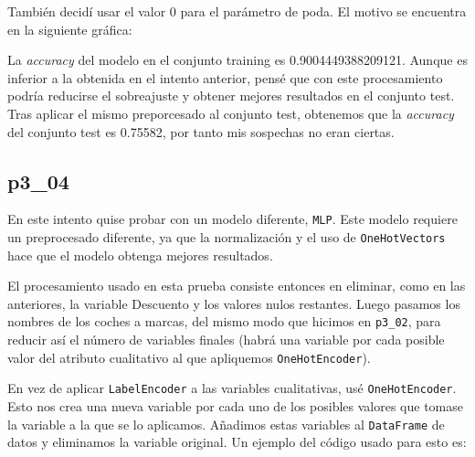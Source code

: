 \documentclass[a4]{article}
\begin{document}
También decidí usar el valor 0 para el parámetro de poda. El motivo se encuentra en la siguiente gráfica:

\begin{figure}[H]
  \centering
\end{figure}


La \textit{accuracy} del modelo en el conjunto training es 0.9004449388209121. Aunque es inferior a la obtenida en el intento anterior, pensé que con este procesamiento podría reducirse el sobreajuste y obtener mejores resultados en el conjunto test. Tras aplicar el mismo preporcesado al conjunto test, obtenemos que la \textit{accuracy} del conjunto test es 0.75582, por tanto mis sospechas no eran ciertas.

\subsection{p3\_04}

En este intento quise probar con un modelo diferente, \texttt{MLP}. Este modelo requiere un preprocesado diferente, ya que la normalización y el uso de \texttt{OneHotVectors} hace que el modelo obtenga mejores resultados.

El procesamiento usado en esta prueba consiste entonces en eliminar, como en las anteriores, la variable Descuento y los valores nulos restantes. Luego pasamos los nombres de los coches a marcas, del mismo modo que hicimos en \texttt{p3\_02}, para reducir así el número de variables finales (habrá una variable por cada posible valor del atributo cualitativo al que apliquemos \texttt{OneHotEncoder}).

En vez de aplicar \texttt{LabelEncoder} a las variables cualitativas, usé \texttt{OneHotEncoder}. Esto nos crea una nueva variable por cada uno de los posibles valores que tomase la variable a la que se lo aplicamos. Añadimos estas variables al \texttt{DataFrame} de datos y eliminamos la variable original. Un ejemplo del código usado para esto es:
\end{document}
